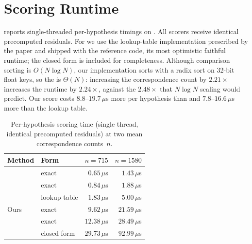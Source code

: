 \section{Scoring Runtime}
\label{sec:supp-deploy}
\label{sec:supp-deploy-runtime}

 reports single-threaded per-hypothesis
timings on \phototourism.  All scorers receive identical precomputed residuals.  For
\magsacpp we use the lookup-table implementation prescribed by the
paper and shipped with the reference code, its most optimistic
faithful runtime; the closed form is included for completeness.
Although comparison sorting is $O(N\log N)$, our implementation sorts
with a radix sort on 32-bit float keys, so the \sortsweep is
$\Theta(N)$: increasing the correspondence count by $2.21\times$
increases the runtime by $2.24\times$, against the $2.48\times$
that $N\log N$ scaling would predict.  Our score costs $8.8$--$19.7\,\mu$s more per hypothesis than \msac
and $7.8$--$16.6\,\mu$s more than the \magsacpp lookup table.

\begin{table}[ht]
	\centering
	\caption{Per-hypothesis scoring time (single thread, identical
		precomputed residuals) at two mean correspondence counts~$\bar n$.}
	\label{tab:runtime-hyp}
	\smallskip
	\begin{tabular}{llrr}
		\toprule
		Method   & Form                 & $\bar n = 715$     & $\bar n = 1580$    \\
		\midrule
		\ransac   & exact                & $0.65\,\mu$s       & $1.43\,\mu$s       \\
		\msac     & exact                & $0.84\,\mu$s       & $1.88\,\mu$s       \\
		\magsacpp & lookup table         & $1.83\,\mu$s       & $5.00\,\mu$s       \\
		Ours     & exact \sortsweep & $9.62\,\mu$s       & $21.59\,\mu$s      \\
		\gau      & exact                & $12.38\,\mu$s      & $28.49\,\mu$s      \\
		\magsacpp & closed form          & $29.73\,\mu$s      & $92.99\,\mu$s      \\
		\bottomrule
	\end{tabular}
\end{table}

